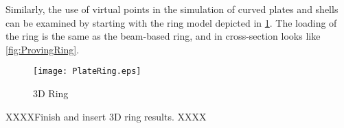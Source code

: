 Similarly, the use of virtual points in the simulation of curved plates and shells can be examined by starting with the ring model depicted in \cref{fig:PlateRing}.
The loading of the ring is the same as the beam-based ring, and in cross-section looks like \cref{fig:ProvingRing}.
%
\begin{figure}[h]
  \centering
  \texttt{[image: PlateRing.eps]}
  \caption{3D Ring}
  \label{fig:PlateRing}
\end{figure}
%

 XXXXFinish and insert 3D ring results. XXXX


